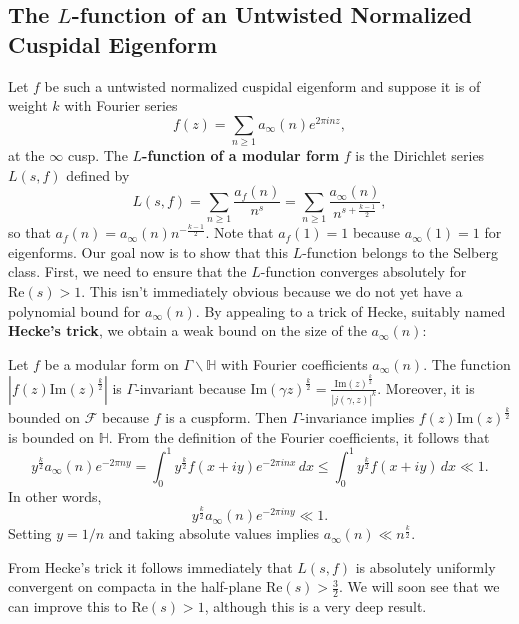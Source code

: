 \documentclass[12pt]{book}
\theoremstyle{definition}\newframedtheorem{method}{Method}
\newcommand{\mc}{\mathcal}
\renewcommand{\H}{\mathbb{H}}
\newcommand{\g}{\gamma}
\newcommand{\G}{\Gamma}
\newcommand{\<}{\langle}
\renewcommand{\>}{\rangle}
\renewcommand{\Re}{\mathrm{Re}}
\renewcommand{\Im}{\mathrm{Im}}
\newcommand{\GH}{\G\backslash\H}
\begin{document}
    \subsection*{The \texorpdfstring{$L$}{L}-function of an Untwisted Normalized Cuspidal Eigenform}
      Let $f$ be such a untwisted normalized cuspidal eigenform and suppose it is of weight $k$ with Fourier series
      \[
        f(z) = \sum_{n \ge 1}a_{\infty}(n)e^{2\pi inz},
      \]
      at the $\infty$ cusp. The \textbf{$L$-function of a modular form} $f$ is the Dirichlet series $L(s,f)$ defined by
      \[
        L(s,f) = \sum_{n \ge 1}\frac{a_{f}(n)}{n^{s}} = \sum_{n \ge 1}\frac{a_{\infty}(n)}{n^{s+\frac{k-1}{2}}},
      \]
      so that $a_{f}(n) = a_{\infty}(n)n^{-\frac{k-1}{2}}$. Note that $a_{f}(1) = 1$ because $a_{\infty}(1) = 1$ for eigenforms. Our goal now is to show that this $L$-function belongs to the Selberg class. First, we need to ensure that the $L$-function converges absolutely for $\Re(s) > 1$. This isn't immediately obvious because we do not yet have a polynomial bound for $a_{\infty}(n)$. By appealing to a trick of Hecke, suitably named \textbf{Hecke's trick}, we obtain a weak bound on the size of the $a_{\infty}(n)$:

      \begin{method}
        Let $f$ be a modular form on $\GH$ with Fourier coefficients $a_{\infty}(n)$. The function $|f(z)\Im(z)^{\frac{k}{2}}|$ is $\G$-invariant because $\Im(\g z)^{\frac{k}{2}} = \frac{\Im(z)^{\frac{k}{2}}}{|j(\g,z)|^{k}}$. Moreover, it is bounded on $\mc{F}$ because $f$ is a cuspform. Then $\G$-invariance implies $f(z)\Im(z)^{\frac{k}{2}}$ is bounded on $\H$. From the definition of the Fourier coefficients, it follows that
        \[
          y^{\frac{k}{2}}a_{\infty}(n)e^{-2\pi ny} = \int_{0}^{1}y^{\frac{k}{2}}f(x+iy)e^{-2\pi inx}\,dx \le \int_{0}^{1}y^{\frac{k}{2}}f(x+iy)\,dx \ll 1.
        \]
        In other words,
        \[
          y^{\frac{k}{2}}a_{\infty}(n)e^{-2\pi iny} \ll 1.
        \]
        Setting $y = 1/n$ and taking absolute values implies $a_{\infty}(n) \ll n^{\frac{k}{2}}$.
      \end{method}

      From Hecke's trick it follows immediately that $L(s,f)$ is absolutely uniformly convergent on compacta in the half-plane $\Re(s) > \frac{3}{2}$. We will soon see that we can improve this to $\Re(s) > 1$, although this is a very deep result.
\end{document}
